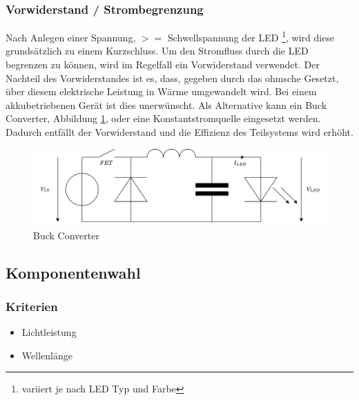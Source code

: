 \documentclass[12pt]{article}
\begin{document}
	\subsubsection*{Vorwiderstand / Strombegrenzung} \label{Vorwiderstand}
	Nach Anlegen einer Spannung, $>=$ Schwellspannung der LED \footnote{variiert je nach LED Typ und Farbe}, wird diese grundsätzlich zu einem Kurzschluss. Um den Stromfluss durch die LED begrenzen zu können, wird im Regelfall ein Vorwiderstand verwendet. Der Nachteil des Vorwiderstandes ist es, dass, gegeben durch das ohmsche Gesetzt, über diesem elektrische Leistung in Wärme umgewandelt wird. Bei einem akkubetriebenen Gerät ist dies unerwünscht. Als Alternative kann ein Buck Converter, Abbildung \ref{fig:batbuck-converter}, oder eine Konstantstromquelle eingesetzt werden. Dadurch entfällt der Vorwiderstand und die Effizienz des Teilsystems wird erhöht.
	\begin{figure}[H]
		\centering
		\includegraphics[width=1\linewidth]{images/BAT_Buck-Converter}
		\caption{Buck Converter}
		\label{fig:batbuck-converter}
	\end{figure}
	\subsection{Komponentenwahl}
	\subsubsection{Kriterien}
	\begin{itemize}
		\item Lichtleistung 
		\item Wellenlänge
	\end{itemize}
\end{document}
